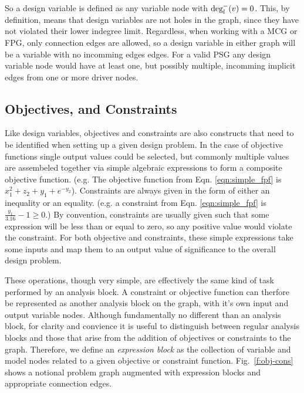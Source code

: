 So a design variable is defined as any variable node with $\textrm{deg}_l^-(v)=0$. 
This, by definition, means that design variables are not holes in the graph, since 
they have not violated their lower indegree limit. Regardless, 
when working with a MCG or FPG, only connection edges are allowed, so a design 
variable in either graph will be a variable with no incomming edges edges. For a valid PSG 
any design variable node would have at least one, but possibly multiple, incomming 
implicit edges from one or more driver nodes. 

\subsection{Objectives, and Constraints}
\label{ss:objectives and constraints}
Like design variables, objectives and constraints are also constructs that need 
to be identified when setting up a given design problem. In the case of 
objective functions single output values could be selected, but commonly multiple 
values are assembeled together via simple algebraic expressions to form a composite 
objective function. (e.g. The objective function from Eqn. \ref{eqn:simple_fpf} is
$x_1^2+z_2+y_1+e^{-y_2}$). Constraints are always given in the 
form of either an inequality or an equality. (e.g. a constraint from Eqn. 
\ref{eqn:simple_fpf} is $\frac{y_1}{3.16}-1\geq0$.) By convention, 
constraints are usually given such that some expression will be less than or equal 
to zero, so any positive value would violate the constraint. For both objective 
and constraints, these simple expressions take some inputs and map them to an
output value of significance to the overall design problem. 

These operations, though very simple, are effectively the same kind of task 
performed by an analysis block. A constraint or objective function can therfore 
be represented as another analysis block on the graph, with it's own input and 
output variable nodes. Although fundamentally no different than an analysis block, 
for clarity and convience it is useful to distinguish between regular analysis 
blocks and those that arise from the addition of objectives or constraints to 
	the graph. Therefore, we define an \emph{expression block} as the collection of variable and model 
	nodes related to a given objective or constraint function. Fig.~\ref{f:obj-cons}
shows a notional problem graph augmented with expression blocks and appropriate 
connection edges. 


